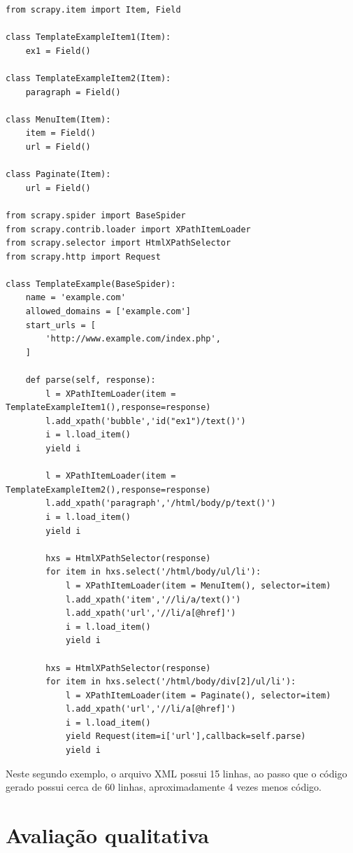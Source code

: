 \begin{lstlisting}
from scrapy.item import Item, Field

class TemplateExampleItem1(Item):
    ex1 = Field()

class TemplateExampleItem2(Item):
    paragraph = Field()
    
class MenuItem(Item):
    item = Field()
    url = Field()
    
class Paginate(Item):
    url = Field()

from scrapy.spider import BaseSpider
from scrapy.contrib.loader import XPathItemLoader
from scrapy.selector import HtmlXPathSelector
from scrapy.http import Request

class TemplateExample(BaseSpider):
    name = 'example.com'
    allowed_domains = ['example.com']
    start_urls = [
        'http://www.example.com/index.php',
    ]

    def parse(self, response):
        l = XPathItemLoader(item = TemplateExampleItem1(),response=response)
        l.add_xpath('bubble','id("ex1")/text()') 
        i = l.load_item()
        yield i
        
        l = XPathItemLoader(item = TemplateExampleItem2(),response=response)
        l.add_xpath('paragraph','/html/body/p/text()') 
        i = l.load_item()
        yield i
        
        hxs = HtmlXPathSelector(response)
        for item in hxs.select('/html/body/ul/li'):
            l = XPathItemLoader(item = MenuItem(), selector=item)
            l.add_xpath('item','//li/a/text()') 
            l.add_xpath('url','//li/a[@href]') 
            i = l.load_item()
            yield i

        hxs = HtmlXPathSelector(response)
        for item in hxs.select('/html/body/div[2]/ul/li'):
            l = XPathItemLoader(item = Paginate(), selector=item)
            l.add_xpath('url','//li/a[@href]') 
            i = l.load_item()
            yield Request(item=i['url'],callback=self.parse)
            yield i
\end{lstlisting}

Neste segundo exemplo, o arquivo XML possui 15 linhas, ao passo que o código gerado possui cerca de 60 linhas, aproximadamente 4 vezes menos código.

\pagebreak
\section{Avaliação qualitativa}

